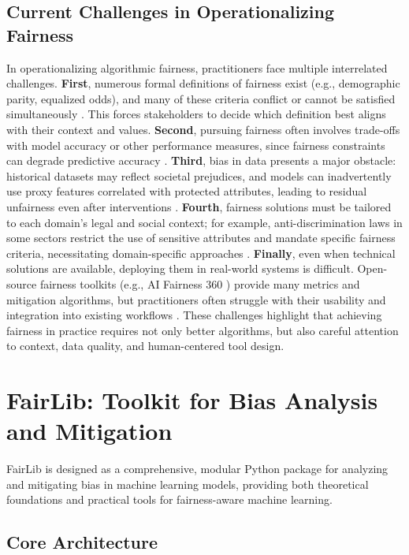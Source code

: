 \documentclass[12pt,a4paper,openright,twoside]{book}
\begin{document}
\section{Current Challenges in Operationalizing Fairness}
In operationalizing algorithmic fairness, practitioners face multiple interrelated challenges. \textbf{First}, numerous formal definitions of fairness exist (e.g., demographic parity, equalized odds), and many of these criteria conflict or cannot be satisfied simultaneously \cite{kusner2017counterfactual,xian2024unified}. This forces stakeholders to decide which definition best aligns with their context and values. \textbf{Second}, pursuing fairness often involves trade-offs with model accuracy or other performance measures, since fairness constraints can degrade predictive accuracy \cite{corbettdavies2017}. \textbf{Third}, bias in data presents a major obstacle: historical datasets may reflect societal prejudices, and models can inadvertently use proxy features correlated with protected attributes, leading to residual unfairness even after interventions \cite{barocas2016}. \textbf{Fourth}, fairness solutions must be tailored to each domain’s legal and social context; for example, anti-discrimination laws in some sectors restrict the use of sensitive attributes and mandate specific fairness criteria, necessitating domain-specific approaches \cite{veale2017}. \textbf{Finally}, even when technical solutions are available, deploying them in real-world systems is difficult. Open-source fairness toolkits (e.g., AI Fairness 360 \cite{bellamy2019aif360}) provide many metrics and mitigation algorithms, but practitioners often struggle with their usability and integration into existing workflows \cite{holstein2019,lee2021}. These challenges highlight that achieving fairness in practice requires not only better algorithms, but also careful attention to context, data quality, and human-centered tool design.

\chapter{FairLib: Toolkit for Bias Analysis and Mitigation}

FairLib is designed as a comprehensive, modular Python package for analyzing and mitigating bias in machine learning models, providing both theoretical foundations and practical tools for fairness-aware machine learning.

\section{Core Architecture}
\end{document}
